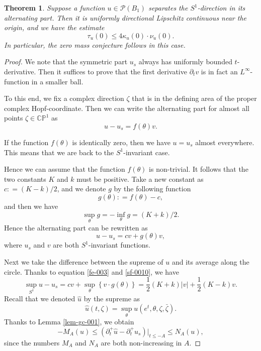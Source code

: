 \documentclass[a4paper,11pt]{amsart}
\numberwithin{equation}{section}
\newtheorem{theorem}{Theorem}[section]
\def\d{\partial}
\def\cP{{\mathcal P}}
\def\cP{{\mathcal P}}
\def\bC{{\mathbb C}}
\def\bP{{\mathbb P}}
\def\z{{\zeta}}
\def\k{{\kappa}}
\begin{document}
\begin{theorem}
\label{cor-sf-001}
Suppose a function $u\in \cP(B_1)$ separates the $S^1$-direction in its alternating part. 
Then it is uniformly directional Lipschitz continuous near the origin, 
and we have the estimate
$$  \tau_u(0) \leq 4 \k_u(0)\cdot \nu_u(0).  $$
In particular, the zero mass conjecture follows in this case. 
\end{theorem}
\begin{proof}
We note that the symmetric part $u_s$ always has uniformly bounded $t$-derivative. 
Then it suffices to prove that the first derivative  
$ \d_t v$ is in fact an $L^{\infty}$-function in a smaller ball. 

To this end, 
we fix a complex direction $\z$ that is in the defining area of 
the proper complex Hopf-coordinate. 
Then we can write the alternating part for almost all points $\z\in \bC\bP^1$ as 
$$ u-u_s = f(\theta)v.$$

If the function $f(\theta)$ 
is identically zero, then we have $u =u_s$ almost everywhere. 
This means that we are back to the $S^1$-invariant case. 

Hence we can assume that the function $f(\theta)$
is non-trivial. 
It follows that 
the two constants $K$ and $k$ must be positive. 
Take a new constant as 
$c: = (K-k)/2$, 
and we denote $g$ by the following function
$$ g(\theta): = f(\theta) -c, $$
and then we have 
\begin{equation}
\label{sf-0010}
\sup_{\theta} g = -\inf_{\theta} g = (K+k)/2.
\end{equation}
Hence the alternating part can be rewritten as 
$$ u - u_s = c v + g(\theta)v,$$
where $u_s$ and $v$ are both $S^1$-invariant functions. 
 
Next we take the difference between the supreme of $u$ and its average along the circle. 
Thanks to equation \eqref{fe-003} and \eqref{sf-0010}, we have  
\begin{equation}
\label{sf-001}
\sup_{S^1} u - u_s = c v + \sup_{\theta } \left\{ v\cdot g(\theta)  \right\} = \frac{1}{2}(K+k) |v| + \frac{1}{2}(K-k) v.
\end{equation}
Recall that we denoted $\hat u$ by the supreme as  
$$ \hat u(t, \z) = \sup_{\theta} u(e^t, \theta, \z, \bar\z). $$
Thanks to Lemma \ref{lem-gc-001}, we obtain
\begin{equation}
\label{sf-002}
- M_A (u) \leq (\d_t^+ \hat u - \d_t^+ u_s )|_{t\leq -A} \leq N_A (u),
\end{equation}
since the numbers $M_A$ and $N_A$ are both non-increasing in $A$.


\end{proof}
\end{document}
